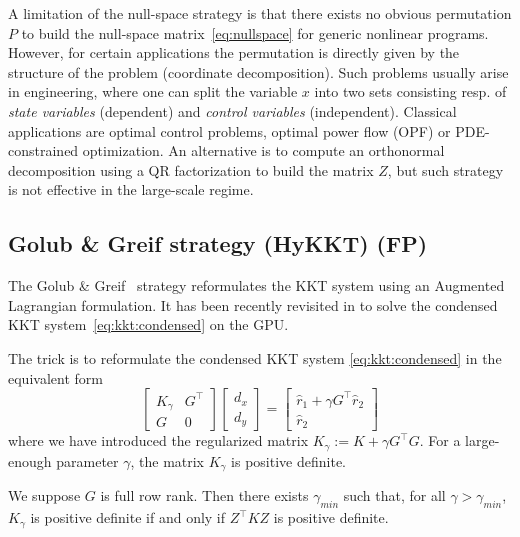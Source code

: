 A limitation of the null-space strategy is that
there exists no obvious permutation $P$ to build the null-space
matrix~\eqref{eq:nullspace} for generic nonlinear programs. However, for certain applications the
permutation is directly given by the structure of the problem
(coordinate decomposition).
Such problems usually arise in engineering, where one can split
the variable $x$ into two sets consisting resp. of \emph{state variables} (dependent)
and \emph{control variables} (independent). Classical applications
are optimal control problems, optimal power flow (OPF) or PDE-constrained optimization.
An alternative is to compute an orthonormal decomposition using a QR factorization
to build the matrix $Z$, but such strategy is not effective in the
large-scale regime.



\subsection{Golub \& Greif strategy (HyKKT) (FP)}
\label{sec:kkt:golubgreif}
The Golub \& Greif~\cite{golub2003solving} strategy reformulates the KKT system
using an Augmented Lagrangian formulation.
It has been recently revisited in \cite{regev2023hykkt}
to solve the condensed KKT system~\eqref{eq:kkt:condensed} on the GPU.

The trick is to reformulate the condensed KKT system \eqref{eq:kkt:condensed} in the equivalent form
\begin{equation}
  \label{eq:kkt:hykkt}
  \begin{bmatrix}
    K_\gamma & G^\top \\
    G & 0
  \end{bmatrix}
  \begin{bmatrix}
    d_x \\ d_y
  \end{bmatrix}
  =
  \begin{bmatrix}
    \hat{r}_1 + \gamma G^\top \hat{r}_2 \\
    \hat{r}_2
  \end{bmatrix}
\end{equation}
where we have introduced the regularized matrix $K_\gamma := K + \gamma G^\top G$.
For a large-enough parameter $\gamma$, the matrix $K_\gamma$ is positive definite.
\begin{proposition}
  We suppose $G$ is full row rank. Then there exists $\gamma_{min}$
  such that, for all $\gamma > \gamma_{min}$, $K_\gamma$ is positive definite
  if and only if $Z^\top K Z$ is positive definite.
\end{proposition}

